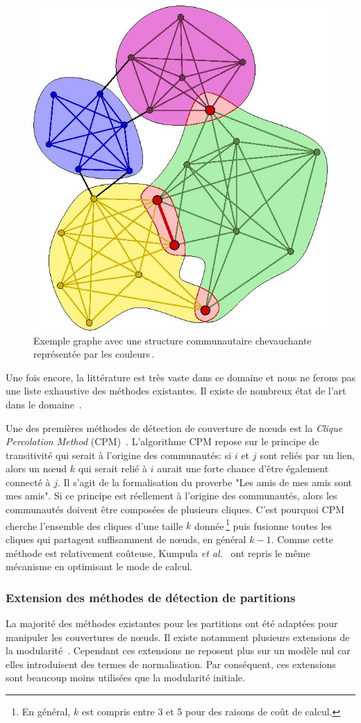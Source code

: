 \begin{figure}
	\centering
	\includegraphics[width=0.31\linewidth]{img/Intro/Illustration_of_overlapping_communities.jpg}
	\caption{Exemple graphe avec une structure communautaire chevauchante représentée par les couleurs\,\protect\footnotemark.}
	\label{fig:ex_overlap_communaute}
\end{figure}

Une fois encore, la littérature est très vaste dans ce domaine et nous ne ferons pas une liste exhaustive des méthodes existantes.
Il existe de nombreux état de l'art dans le domaine~\cite{ Kanawati2014, Xie2013,Bandyopadhyay2015, Hric2014a}.

Une des premières méthodes de détection de couverture de n\oe{}uds est la \emph{Clique Percolation Method} (CPM)~\cite{Palla2005}.
L'algorithme CPM repose sur le principe de transitivité qui serait à l'origine des communautés: si $i$ et $j$ sont reliés par un lien, alors un n\oe{}ud $k$ qui serait relié à $i$ aurait une forte chance d'être également connecté à $j$.
Il s'agit de la formalisation du proverbe "Les amis de mes amis sont mes amis".
Si ce principe est réellement à l'origine des communautés, alors les communautés doivent être composées de plusieurs cliques.
C'est pourquoi CPM cherche l'ensemble des cliques d'une taille $k$ donnée\,\footnote{En général, $k$ est compris entre 3 et 5 pour des raisons de coût de calcul.} puis fusionne toutes les cliques qui partagent suffisamment de n\oe{}uds, en général $k-1$. 
Comme cette méthode est relativement coûteuse, Kumpula \emph{et al.}~\cite{Kumpula2008} ont repris le même mécanisme en optimisant le mode de calcul.

\subsubsection{Extension des méthodes de détection de partitions}

La majorité des méthodes existantes pour les partitions ont été adaptées pour manipuler les couvertures de n\oe{}uds.
Il existe notamment plusieurs extensions de la modularité~\cite{Shen2009,Nicosia2009}.
Cependant ces extensions ne reposent plus sur un modèle nul car elles introduisent des termes de normalisation.
Par conséquent, ces extensions sont beaucoup moins utilisées que la modularité initiale.

